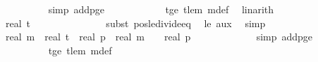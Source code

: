 \begin{isabellebody}
\ \ \ \ \ \ \ \ \ \ \isamarkupfalse%
\ {\isacharparenleft}{\kern0pt}simp\ add{\isacharcolon}{\kern0pt}p{\isacharunderscore}{\kern0pt}ge{\isacharunderscore}{\kern0pt}{}{\isacharparenright}{\kern0pt}\isanewline
\ \ \ \ \ \ \ \ \ \ \isamarkupfalse%
\ t{\isacharunderscore}{\kern0pt}ge{\isacharunderscore}{\kern0pt}{}\ t{\isacharunderscore}{\kern0pt}le{\isacharunderscore}{\kern0pt}m\ m{\isacharunderscore}{\kern0pt}def\ \isamarkupfalse%
\ linarith\isanewline
\ \ \ \ \ \ \ \ \isamarkupfalse%
\ \isamarkupfalse%
\ {\isachardoublequoteopen}{\isachardot}{\kern0pt}{\isachardot}{\kern0pt}{\isachardot}{\kern0pt}\ {\isasymle}\ real\ t\ {\isacharslash}{\kern0pt}\ {\isacharparenleft}{\kern0pt}{}{\isacharminus}{\kern0pt}{\isasymdelta}{\isacharprime}{\kern0pt}{\isacharparenright}{\kern0pt}{\isachardoublequoteclose}\ \isanewline
\ \ \ \ \ \ \ \ \ \ \isamarkupfalse%
\ {\isacharparenleft}{\kern0pt}subst\ pos{\isacharunderscore}{\kern0pt}le{\isacharunderscore}{\kern0pt}divide{\isacharunderscore}{\kern0pt}eq{\isacharparenright}{\kern0pt}\ \isamarkupfalse%
\ {\isasymdelta}{\isacharprime}{\kern0pt}{\isacharunderscore}{\kern0pt}le{\isacharunderscore}{\kern0pt}{}\ aux\ \isamarkupfalse%
\ simp{\isacharplus}{\kern0pt}\isanewline
\ \ \ \ \ \ \ \ \isamarkupfalse%
\ \isamarkupfalse%
\ {\isachardoublequoteopen}{\isachardot}{\kern0pt}{\isachardot}{\kern0pt}{\isachardot}{\kern0pt}\ {\isacharequal}{\kern0pt}\ real\ m\ {\isacharasterisk}{\kern0pt}\ {\isacharparenleft}{\kern0pt}real\ t\ {\isacharasterisk}{\kern0pt}\ real\ p\ {\isacharslash}{\kern0pt}\ {\isacharparenleft}{\kern0pt}real\ m\ {\isacharasterisk}{\kern0pt}\ {\isacharparenleft}{\kern0pt}{}{\isacharminus}{\kern0pt}{\isasymdelta}{\isacharprime}{\kern0pt}{\isacharparenright}{\kern0pt}{\isacharparenright}{\kern0pt}{\isacharparenright}{\kern0pt}\ {\isacharslash}{\kern0pt}\ real\ p{\isachardoublequoteclose}\ \isanewline
\ \ \ \ \ \ \ \ \ \ \isamarkupfalse%
\ {\isacharparenleft}{\kern0pt}simp\ add{\isacharcolon}{\kern0pt}p{\isacharunderscore}{\kern0pt}ge{\isacharunderscore}{\kern0pt}{}{\isacharparenright}{\kern0pt}\isanewline
\ \ \ \ \ \ \ \ \ \ \isamarkupfalse%
\ t{\isacharunderscore}{\kern0pt}ge{\isacharunderscore}{\kern0pt}{}\ t{\isacharunderscore}{\kern0pt}le{\isacharunderscore}{\kern0pt}m\ m{\isacharunderscore}{\kern0pt}def\ \isamarkupfalse%

\end{isabellebody}
